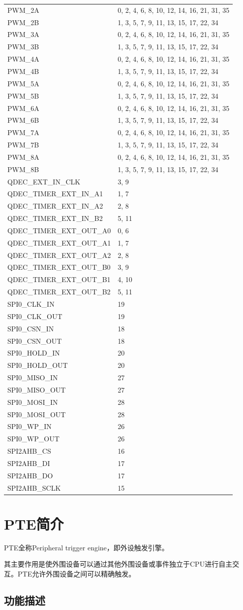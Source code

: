 \documentclass[
  12pt,
]{book}
\begin{document}
\begin{longtable}[]{@{}ll@{}}
PWM\_2A & 0, 2, 4, 6, 8, 10, 12, 14, 16, 21, 31, 35\tabularnewline
PWM\_2B & 1, 3, 5, 7, 9, 11, 13, 15, 17, 22, 34\tabularnewline
PWM\_3A & 0, 2, 4, 6, 8, 10, 12, 14, 16, 21, 31, 35\tabularnewline
PWM\_3B & 1, 3, 5, 7, 9, 11, 13, 15, 17, 22, 34\tabularnewline
PWM\_4A & 0, 2, 4, 6, 8, 10, 12, 14, 16, 21, 31, 35\tabularnewline
PWM\_4B & 1, 3, 5, 7, 9, 11, 13, 15, 17, 22, 34\tabularnewline
PWM\_5A & 0, 2, 4, 6, 8, 10, 12, 14, 16, 21, 31, 35\tabularnewline
PWM\_5B & 1, 3, 5, 7, 9, 11, 13, 15, 17, 22, 34\tabularnewline
PWM\_6A & 0, 2, 4, 6, 8, 10, 12, 14, 16, 21, 31, 35\tabularnewline
PWM\_6B & 1, 3, 5, 7, 9, 11, 13, 15, 17, 22, 34\tabularnewline
PWM\_7A & 0, 2, 4, 6, 8, 10, 12, 14, 16, 21, 31, 35\tabularnewline
PWM\_7B & 1, 3, 5, 7, 9, 11, 13, 15, 17, 22, 34\tabularnewline
PWM\_8A & 0, 2, 4, 6, 8, 10, 12, 14, 16, 21, 31, 35\tabularnewline
PWM\_8B & 1, 3, 5, 7, 9, 11, 13, 15, 17, 22, 34\tabularnewline
QDEC\_EXT\_IN\_CLK & 3, 9\tabularnewline
QDEC\_TIMER\_EXT\_IN\_A1 & 1, 7\tabularnewline
QDEC\_TIMER\_EXT\_IN\_A2 & 2, 8\tabularnewline
QDEC\_TIMER\_EXT\_IN\_B2 & 5, 11\tabularnewline
QDEC\_TIMER\_EXT\_OUT\_A0 & 0, 6\tabularnewline
QDEC\_TIMER\_EXT\_OUT\_A1 & 1, 7\tabularnewline
QDEC\_TIMER\_EXT\_OUT\_A2 & 2, 8\tabularnewline
QDEC\_TIMER\_EXT\_OUT\_B0 & 3, 9\tabularnewline
QDEC\_TIMER\_EXT\_OUT\_B1 & 4, 10\tabularnewline
QDEC\_TIMER\_EXT\_OUT\_B2 & 5, 11\tabularnewline
SPI0\_CLK\_IN & 19\tabularnewline
SPI0\_CLK\_OUT & 19\tabularnewline
SPI0\_CSN\_IN & 18\tabularnewline
SPI0\_CSN\_OUT & 18\tabularnewline
SPI0\_HOLD\_IN & 20\tabularnewline
SPI0\_HOLD\_OUT & 20\tabularnewline
SPI0\_MISO\_IN & 27\tabularnewline
SPI0\_MISO\_OUT & 27\tabularnewline
SPI0\_MOSI\_IN & 28\tabularnewline
SPI0\_MOSI\_OUT & 28\tabularnewline
SPI0\_WP\_IN & 26\tabularnewline
SPI0\_WP\_OUT & 26\tabularnewline
SPI2AHB\_CS & 16\tabularnewline
SPI2AHB\_DI & 17\tabularnewline
SPI2AHB\_DO & 17\tabularnewline
SPI2AHB\_SCLK & 15\tabularnewline
\bottomrule
\end{longtable}

\hypertarget{pteux7b80ux4ecb}{%
\chapter{PTE简介}\label{pteux7b80ux4ecb}}

PTE全称Peripheral trigger engine，即外设触发引擎。

其主要作用是使外围设备可以通过其他外围设备或事件独立于CPU进行自主交互。PTE允许外围设备之间可以精确触发。

\hypertarget{ux529fux80fdux63cfux8ff0-2}{%
\section{功能描述}\label{ux529fux80fdux63cfux8ff0-2}}
\end{document}

